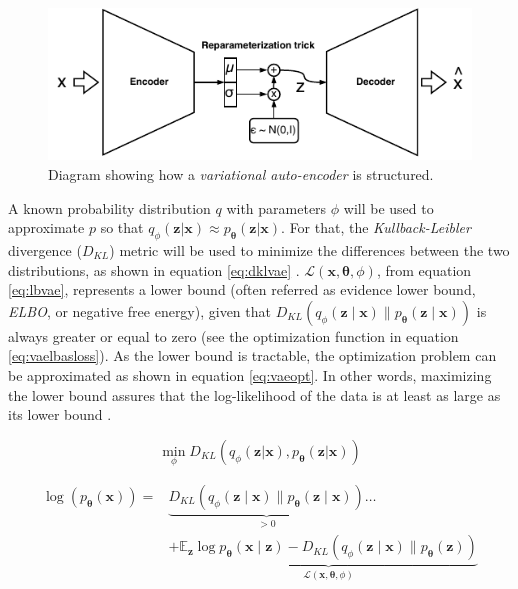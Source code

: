 \begin{figure}[h!]
	\centering
	\includegraphics[width=1\linewidth]{background/images/vae}
	\caption[\textit{Variational auto-encoder}]{Diagram showing how a \textit{variational auto-encoder} is structured. }
	\label{fig:vae}
\end{figure}

A known probability distribution $q$ with parameters $\phi$ will be used to approximate $p$ so that $q_\phi(\mathbf{z}|\mathbf{x}) \approx p_\mathbf{\theta}(\mathbf{z}|\mathbf{x})$. For that, the \textit{Kullback-Leibler} divergence ($D_{KL}$) metric will be used to minimize the differences between the two distributions, as shown in equation \ref{eq:dklvae} \autocite{kingma2019}. $\mathcal{L}(\mathbf{x}, \mathbf{\theta}, \phi)$, from equation \ref{eq:lbvae}, represents a lower bound (often referred as evidence lower bound, \textit{ELBO}, or negative free energy), given that $D_{K L}\left(q_{\phi}(\mathbf{z} \mid \mathbf{x}) \| p_{\mathbf{\theta}}(\mathbf{z} \mid \mathbf{x})\right)$ is always greater or equal to zero (see the optimization function in equation \ref{eq:vaelbasloss}). As the lower bound is tractable, the optimization problem can be approximated as shown in equation \ref{eq:vaeopt}. In other words, maximizing the lower bound assures that the log-likelihood of the data is at least as large as its lower bound \autocite{wei2021}.

\begin{equation}
\label{eq:dklvae}
\min_{\phi} D_{KL}\left(q_\phi(\mathbf{z}|\mathbf{x}), p_\mathbf{\theta}(\mathbf{z}|\mathbf{x})\right)
\end{equation}

\begin{equation}
\label{eq:lbvae}
\begin{aligned}
\log \left(p_{\mathbf{\theta}}(\mathbf{x})\right) =& \underbrace{D_{K L}\left(q_{\phi}(\mathbf{z} \mid \mathbf{x}) \| p_{\mathbf{\theta}}(\mathbf{z} \mid \mathbf{x})\right)}_{>0} \ldots \\
&+\underbrace{\mathbb{E}_{\mathbf{z}} \log p_{\mathbf{\theta}}(\mathbf{x} \mid \mathbf{z})-D_{K L}\left(q_{\phi}(\mathbf{z} \mid \mathbf{x}) \| p_{\mathbf{\theta}}(\mathbf{z})\right)}_{\mathcal{L}(\mathbf{x}, \mathbf{\theta}, \phi)}
\end{aligned}
\end{equation}

